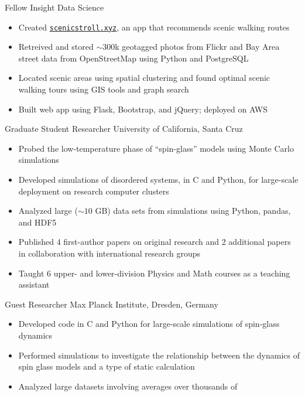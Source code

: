\documentclass[11pt,serif]{cv}
\begin{document}
\begin{cvjobs}
    {Fellow}
    {Insight Data Science}
    {%
      \begin{itemize}
        \item Created
          \href{http://scenicstroll.xyz}{\texttt{scenicstroll.xyz}}, an app
          that recommends scenic walking routes
        \item Retreived and stored $\sim 300$k geotagged photos from Flickr and
          Bay Area street data from OpenStreetMap using Python and PostgreSQL
        \item Located scenic areas using spatial clustering and found optimal
          scenic walking tours using GIS tools and graph search
        \item Built web app using Flask, Bootstrap, and jQuery; deployed on AWS
      \end{itemize}
    }
    {Graduate Student Researcher}
    {University of California, Santa Cruz}
    {%
      \begin{itemize}[topsep=0pt]
        \item Probed the low-temperature phase of ``spin-glass'' models using
          Monte Carlo simulations
        \item Developed simulations of disordered systems, in C and Python, for
          large-scale deployment on research computer clusters
        \item Analyzed large ($\sim 10$ GB) data sets from simulations using
          Python, pandas, and HDF5
        \item Published 4 first-author papers on original research and 2
          additional papers in collaboration with international research groups
        \item Taught 6 upper- and lower-division Physics and Math courses as a
          teaching assistant
      \end{itemize}
    }
    {Guest Researcher}
    {Max Planck Institute, Dresden, Germany}
    {%
      \begin{itemize}
        \item Developed code in C and Python for large-scale simulations of
          spin-glass dynamics
        \item Performed simulations to investigate the relationship between the
          dynamics of spin glass models and a type of static calculation
        \item Analyzed large datasets involving averages over thousands of

\end{itemize}}
\end{cvjobs}
\end{document}

